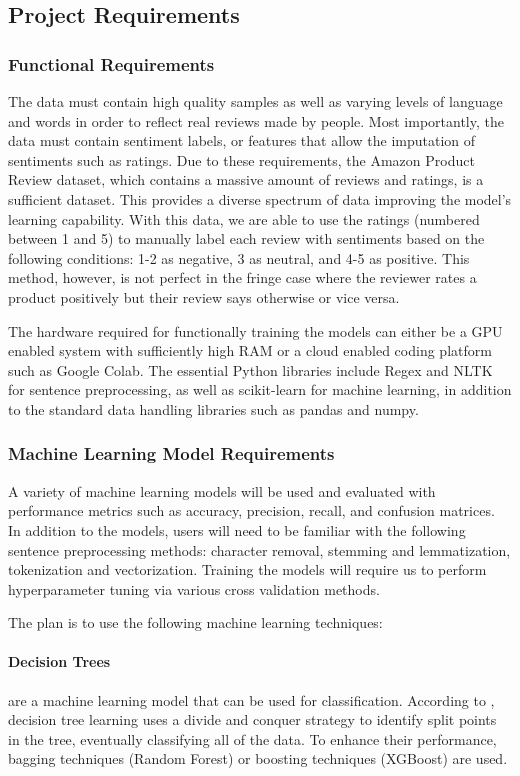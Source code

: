 \documentclass[stu,12pt,floatsintext]{apa7}
\begin{document}
\subsection{Project Requirements}
\subsubsection{Functional Requirements}
The data must contain high quality samples as well as varying levels of language and words in order to reflect real reviews made by people. Most importantly, the data must contain sentiment labels, or features that allow the imputation of sentiments such as ratings. Due to these requirements, the Amazon Product Review dataset, which contains a massive amount of reviews and ratings, is a sufficient dataset. This provides a diverse spectrum of data improving the model’s learning capability. With this data, we are able to use the ratings (numbered between 1 and 5) to manually label each review with sentiments based on the following conditions: 1-2 as negative, 3 as neutral, and 4-5 as positive. This method, however, is not perfect in the fringe case where the reviewer rates a product positively but their review says otherwise or vice versa. 

The hardware required for functionally training the models can either be a GPU enabled system with sufficiently high RAM or a cloud enabled coding platform such as Google Colab. The essential Python libraries include Regex and NLTK for sentence preprocessing, as well as scikit-learn for machine learning, in addition to the standard data handling libraries such as pandas and numpy.


\subsubsection{Machine Learning Model Requirements}
A variety of machine learning models will be used and evaluated with performance metrics such as accuracy, precision, recall, and confusion matrices. In addition to the models, users will need to be familiar with the following sentence preprocessing methods: character removal, stemming and lemmatization, tokenization and vectorization. Training the models will require us to perform hyperparameter tuning via various cross validation methods.

The plan is to use the following machine learning techniques:

\paragraph{Decision Trees} are a machine learning model that can be used for classification. According to \textcite{ibm2024decisiontree}, decision tree learning uses a divide and conquer strategy to identify split points in the tree, eventually classifying all of the data. To enhance their performance, bagging techniques (Random Forest) or boosting techniques (XGBoost) are used.
\end{document}
